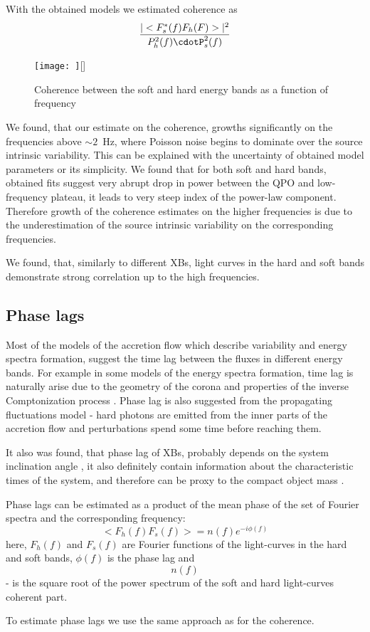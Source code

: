 With the obtained models we estimated coherence as 
$$\frac{|<F_s^*(f)F_h(F)>|^2}{P_{h}^2(f)\cdotP_{s}^2(f)}$$

\begin{figure}
\texttt{[image: ]}[] 
\caption{Coherence between the soft and hard energy bands as a function of frequency} %
\label{fig:coherence}
\end{figure}

We found, that our estimate on the coherence, growths significantly on the frequencies above $\sim2$~Hz, where Poisson noise begins to dominate over the source intrinsic variability.
This can be explained with the uncertainty of obtained model parameters or its simplicity. 
We found that for both soft and hard bands, obtained fits suggest very abrupt drop in power between the QPO and low-frequency plateau, it leads to very steep index of the power-law component. 
Therefore growth of the coherence estimates on the higher frequencies is due to the underestimation of the source intrinsic variability on the corresponding frequencies.

We found, that, similarly to different XBs, light curves in the hard and soft bands demonstrate strong correlation up to the high frequencies.

\subsection{Phase lags}
    Most of the models of the accretion flow which describe variability and energy spectra formation, suggest the time lag between the fluxes in different energy bands. 
For example in some models of the energy spectra formation, time lag is naturally arise due to the geometry of the corona and properties of the inverse Comptonization process \citep[see, e.g.][]{kotov01}.
Phase lag is also suggested from the propagating fluctuations model - hard photons are emitted from the inner parts of the accretion flow and perturbations spend some time before reaching them. 

It also was found, that phase lag of XBs, probably depends on the system inclination angle \citep{eijeden17}, it also definitely contain information about the characteristic times of the system, and therefore can be proxy to the compact object mass \citep{}. 

Phase lags can be estimated as a product of the mean phase of the set of Fourier spectra and the corresponding frequency:
$$<F_h(f)F_s(f)> = n(f)e^{-i\phi(f)}$$ 
here, $F_h(f)$ and $F_s(f)$ are Fourier functions of the light-curves in the hard and soft bands, $\phi(f)$ is the phase lag and $$n(f)$$ - is the square root of the power spectrum of the soft and hard light-curves coherent part. 

To estimate phase lags we use the same approach as for the coherence.



